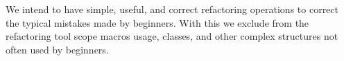 We intend to have simple, useful, and correct refactoring operations to correct the typical mistakes made by beginners.
With this we exclude from the refactoring tool scope  macros usage, classes, and other complex structures
not often used by beginners.

